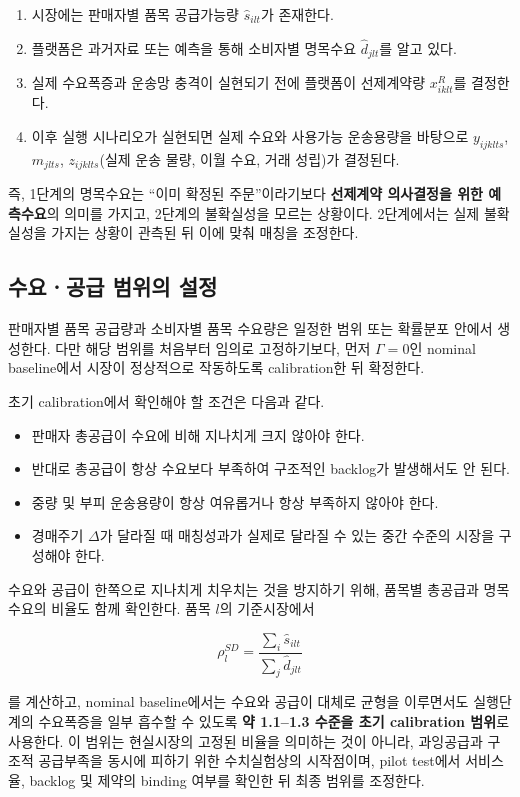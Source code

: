 \documentclass[11pt,a4paper]{article}
\begin{document}
\begin{enumerate}[label=\arabic*)]
    \item 시장에는 판매자별 품목 공급가능량 $\hat s_{ilt}$가 존재한다.
    \item 플랫폼은 과거자료 또는 예측을 통해 소비자별 명목수요 $\hat d_{jlt}$를 알고 있다.
    \item 실제 수요폭증과 운송망 충격이 실현되기 전에 플랫폼이 선제계약량 $x^R_{iklt}$를 결정한다.
    \item 이후 실행 시나리오가 실현되면 실제 수요와 사용가능 운송용량을 바탕으로
    $y_{ijklts}$, $m_{jlts}$, $z_{ijklts}$(실제 운송 물량, 이월 수요, 거래 성립)가 결정된다.
\end{enumerate}

즉, 1단계의 명목수요는 ``이미 확정된 주문''이라기보다
\textbf{선제계약 의사결정을 위한 예측수요}의 의미를 가지고, 2단계의 불확실성을 모르는 상황이다.
2단계에서는 실제 불확실성을 가지는 상황이 관측된 뒤 이에 맞춰 매칭을 조정한다.

\subsection{수요ㆍ공급 범위의 설정}

판매자별 품목 공급량과 소비자별 품목 수요량은 일정한 범위 또는 확률분포 안에서 생성한다.
다만 해당 범위를 처음부터 임의로 고정하기보다,
먼저 $\Gamma=0$인 nominal baseline에서 시장이 정상적으로 작동하도록 calibration한 뒤 확정한다.

초기 calibration에서 확인해야 할 조건은 다음과 같다.

\begin{itemize}
    \item 판매자 총공급이 수요에 비해 지나치게 크지 않아야 한다.
    \item 반대로 총공급이 항상 수요보다 부족하여 구조적인 backlog가 발생해서도 안 된다.
    \item 중량 및 부피 운송용량이 항상 여유롭거나 항상 부족하지 않아야 한다.
    \item 경매주기 $\Delta$가 달라질 때 매칭성과가 실제로 달라질 수 있는 중간 수준의 시장을 구성해야 한다.
\end{itemize}

수요와 공급이 한쪽으로 지나치게 치우치는 것을 방지하기 위해,
품목별 총공급과 명목수요의 비율도 함께 확인한다. 품목 $l$의 기준시장에서

\[
\rho_l^{SD}
=
\frac{\sum_i \hat s_{ilt}}{\sum_j \hat d_{jlt}}
\]

를 계산하고, nominal baseline에서는 수요와 공급이 대체로 균형을 이루면서도
실행단계의 수요폭증을 일부 흡수할 수 있도록 \textbf{약 1.1--1.3 수준을 초기 calibration 범위}로 사용한다.
이 범위는 현실시장의 고정된 비율을 의미하는 것이 아니라,
과잉공급과 구조적 공급부족을 동시에 피하기 위한 수치실험상의 시작점이며,
pilot test에서 서비스율, backlog 및 제약의 binding 여부를 확인한 뒤 최종 범위를 조정한다.
\end{document}
